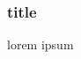 \PraesentationMasterWeissBlau
\begin{frame}
\end{frame}
\PraesentationMasterStandard

\begin{frame}
    \frametitle{title}
    \vspace{0.5cm}
    lorem ipsum
\end{frame}






